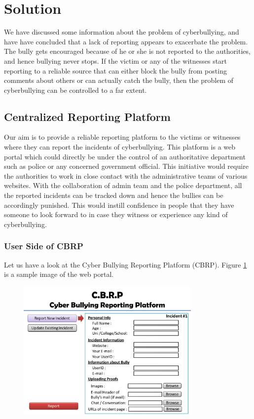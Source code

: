 \section{Solution}
We have discussed some information about the problem of cyberbullying, and have have concluded that a lack of reporting appears to exacerbate the problem. The bully gets encouraged because of he or she is not reported to the authorities, and hence bullying never stops. If the victim or any of the witnesses start reporting to a reliable source that can either block the bully from posting comments about others or can actually catch the bully, then the problem of cyberbullying can be controlled to a far extent.

\subsection{Centralized Reporting Platform}
Our aim is to provide a reliable reporting platform to the victims or witnesses where they can report the incidents of cyberbullying. This platform is a web portal which could directly be under the control of an authoritative department such as police or any concerned government official. This initiative would require the authorities to work in close contact with the administrative teams of various websites. With the collaboration of admin team and the police department, all the reported incidents can be tracked down and hence the bullies can be accordingly punished. This would instill confidence in people that they have someone to look forward to in case they witness or experience any kind of cyberbullying.

\subsubsection{User Side of CBRP}
Let us have a look at the Cyber Bullying Reporting Platform (CBRP). Figure \ref{Figure_1} is a sample image of the web portal. 


\begin{figure}[h]
\centering
\includegraphics[width=0.8\textwidth]{images/Figure_1}
\caption{}
\label{Figure_1}
\end{figure}


